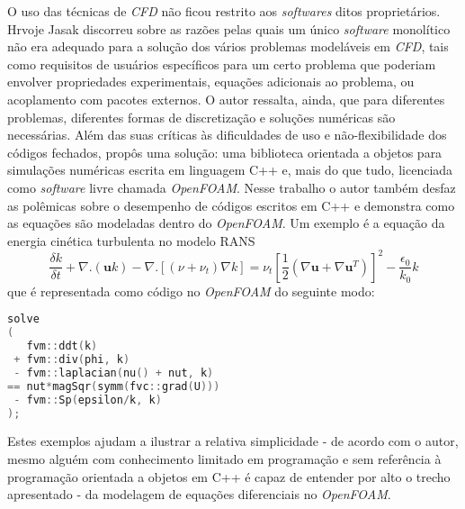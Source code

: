 O uso das técnicas de \textit{CFD} não ficou restrito aos \textit{softwares} ditos proprietários.
Hrvoje Jasak discorreu sobre as razões pelas quais um único \textit{software} monolítico
não era adequado para a solução dos vários problemas modeláveis em \textit{CFD}, tais como requisitos
de usuários específicos para um certo problema que poderiam envolver propriedades
experimentais, equações adicionais ao problema, ou acoplamento com pacotes externos.
O autor ressalta, ainda, que para diferentes problemas, diferentes formas de discretização
e soluções numéricas são necessárias. Além das suas críticas às dificuldades de uso e
não-flexibilidade dos códigos fechados, propôs uma solução: uma biblioteca
orientada a objetos para simulações numéricas escrita em linguagem C++ e, mais do que tudo,
licenciada como \textit{software} livre \cite{Jasak2007} chamada \textit{OpenFOAM}.
Nesse trabalho o autor também desfaz as polêmicas sobre o desempenho de códigos escritos
em C++ e demonstra como as equações são modeladas dentro do \textit{OpenFOAM}. Um
exemplo é a equação da energia cinética turbulenta no modelo RANS
\begin{equation}
  \frac{\delta k}{\delta t} + \nabla . (\mathbf{u}k) - \nabla . [(\nu + \nu_{t})
    \nabla k] = \nu_t \left[ \frac{1}{2}(\nabla \mathbf{u} + \nabla \mathbf{u}^T)\right]^2 - \frac{\epsilon_0}{k_0}k
\end{equation}
que é representada como código no \textit{OpenFOAM} do seguinte modo:
\begin{lstlisting}[language=c++]
solve
(
   fvm::ddt(k)
 + fvm::div(phi, k)
 - fvm::laplacian(nu() + nut, k)
== nut*magSqr(symm(fvc::grad(U)))
 - fvm::Sp(epsilon/k, k)
);  
\end{lstlisting}

Estes exemplos ajudam a ilustrar a relativa simplicidade - de acordo com o autor, mesmo
alguém com conhecimento limitado em programação e sem referência à programação orientada
a objetos em C++ é capaz de entender por alto o trecho apresentado - da modelagem
de equações diferenciais no \textit{OpenFOAM}.

